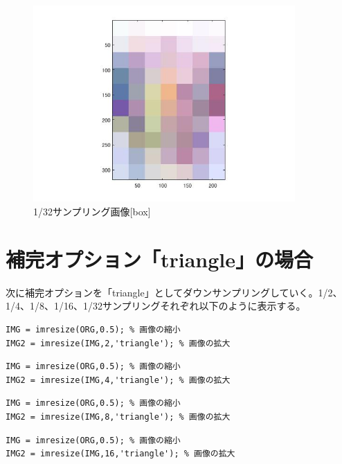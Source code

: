 \documentclass{jsarticle}
\begin{document}
\begin{figure}[htbp]
 \begin{center}
  \includegraphics[width=10cm]{kadai1-5.jpg}
 \end{center}
 \caption{1/32サンプリング画像[box]}
\end{figure}

\clearpage
\section{補完オプション「triangle」の場合}
次に補完オプションを「triangle」としてダウンサンプリングしていく。1/2、1/4、1/8、1/16、1/32サンプリングそれぞれ以下のように表示する。

\begin{lstlisting}[basicstyle=\ttfamily\footnotesize, frame=single]
IMG = imresize(ORG,0.5); % 画像の縮小
IMG2 = imresize(IMG,2,'triangle'); % 画像の拡大
 \end{lstlisting}

\begin{lstlisting}[basicstyle=\ttfamily\footnotesize, frame=single]
IMG = imresize(ORG,0.5); % 画像の縮小
IMG2 = imresize(IMG,4,'triangle'); % 画像の拡大
 \end{lstlisting}

\begin{lstlisting}[basicstyle=\ttfamily\footnotesize, frame=single]
IMG = imresize(ORG,0.5); % 画像の縮小
IMG2 = imresize(IMG,8,'triangle'); % 画像の拡大
 \end{lstlisting}

\begin{lstlisting}[basicstyle=\ttfamily\footnotesize, frame=single]
IMG = imresize(ORG,0.5); % 画像の縮小
IMG2 = imresize(IMG,16,'triangle'); % 画像の拡大
 \end{lstlisting}
\end{document}
